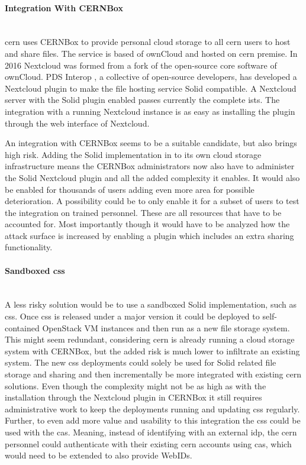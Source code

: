 \paragraph{Integration With CERNBox}\mbox{}\\

\gls{cern} uses CERNBox \cite{cernbox} to provide personal cloud storage to all \gls{cern} users to host and share files. The service is based of ownCloud \cite{owncloud} and hosted on \gls{cern} premise. In 2016 Nextcloud \cite{nextcloud} was formed from a fork of the open-source core software of ownCloud. PDS Interop \cite{pds-interop}, a collective of open-source developers, has developed a Nextcloud \cite{nextcloud} plugin to make the file hosting service Solid compatible. A Nextcloud server with the Solid plugin enabled passes currently the complete \gls{ists}. The integration with a running Nextcloud instance is as easy as installing the plugin through the web interface of Nextcloud.

An integration with CERNBox seems to be a suitable candidate, but also brings high risk. Adding the Solid implementation in to its own cloud storage infrastructure means the CERNBox administrators now also have to administer the Solid Nextcloud plugin and all the added complexity it enables. It would also be enabled for thousands of users adding even more area for possible deterioration.
A possibility could be to only enable it for a subset of users to test the integration on trained personnel. These are all resources that have to be accounted for. Most importantly though it would have to be analyzed how the attack surface is increased by enabling a plugin which includes an extra sharing functionality.
\vspace{0.5cm}
\paragraph{Sandboxed \gls{css}}\mbox{}\\

A less risky solution would be to use a sandboxed Solid implementation, such as \gls{css}. Once \gls{css} is released under a major version it could be deployed to self-contained OpenStack VM instances and then run as a new file storage system. This might seem redundant, considering \gls{cern} is already running a cloud storage system with CERNBox, but the added risk is much lower to infiltrate an existing system. The new \gls{css} deployments could solely be used for Solid related file storage and sharing and then incrementally be more integrated with existing \gls{cern} solutions. Even though the complexity might not be as high as with the installation through the Nextcloud plugin in CERNBox it still requires administrative work to keep the deployments running and updating \gls{css} regularly. Further, to even add more value and usability to this integration the \gls{css} could be used with the \gls{cas}. Meaning, instead of identifying with an external \gls{idp}, the \gls{cern} personnel could authenticate with their existing \gls{cern} accounts using \gls{cas}, which would need to be extended to also provide WebIDs.

